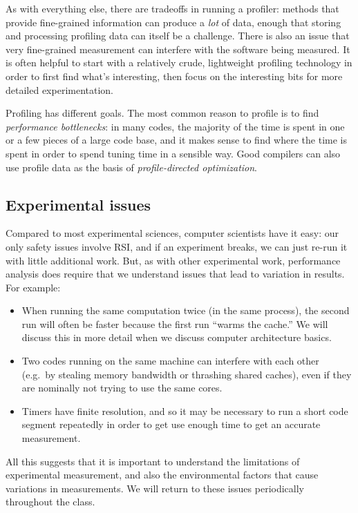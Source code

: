 \documentclass[12pt, leqno]{article} %
\begin{document}
As with everything else, there are tradeoffs in running a profiler:
methods that provide fine-grained information can produce a \emph{lot}
of data, enough that storing and processing profiling data can itself be
a challenge. There is also an issue that very fine-grained measurement
can interfere with the software being measured. It is often helpful to
start with a relatively crude, lightweight profiling technology in order
to first find what's interesting, then focus on the interesting bits for
more detailed experimentation.

Profiling has different goals. The most common reason to profile is to
find \emph{performance bottlenecks}: in many codes, the majority of the
time is spent in one or a few pieces of a large code base, and it makes
sense to find where the time is spent in order to spend tuning time in a
sensible way. Good compilers can also use profile data as the basis of
\emph{profile-directed optimization}.

\subsection{Experimental issues}

Compared to most experimental sciences, computer scientists have it
easy: our only safety issues involve RSI, and if an experiment breaks,
we can just re-run it with little additional work. But, as with other
experimental work, performance analysis does require that we understand
issues that lead to variation in results. For example:

\begin{itemize}
\item
  When running the same computation twice (in the same process), the
  second run will often be faster because the first run ``warms the
  cache.'' We will discuss this in more detail when we discuss computer
  architecture basics.
\item
  Two codes running on the same machine can interfere with each other
  (e.g.~by stealing memory bandwidth or thrashing shared caches), even
  if they are nominally not trying to use the same cores.
\item
  Timers have finite resolution, and so it may be necessary to run a
  short code segment repeatedly in order to get use enough time to get
  an accurate measurement.
\end{itemize}

All this suggests that it is important to understand the limitations of
experimental measurement, and also the environmental factors that cause
variations in measurements. We will return to these issues periodically
throughout the class.
\end{document}
